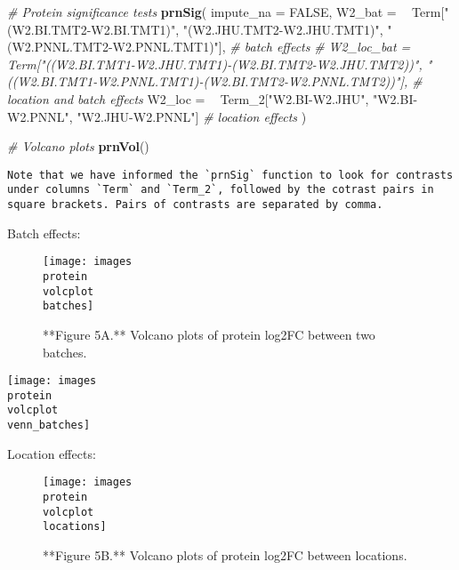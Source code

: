 \documentclass[]{article}
\newenvironment{Shaded}{\begin{snugshade}}{\end{snugshade}}
\newcommand{\CommentTok}[1]{\textcolor[rgb]{0.56,0.35,0.01}{\textit{#1}}}
\newcommand{\DataTypeTok}[1]{\textcolor[rgb]{0.13,0.29,0.53}{#1}}
\newcommand{\DecValTok}[1]{\textcolor[rgb]{0.00,0.00,0.81}{#1}}
\newcommand{\KeywordTok}[1]{\textcolor[rgb]{0.13,0.29,0.53}{\textbf{#1}}}
\newcommand{\NormalTok}[1]{#1}
\newcommand{\OperatorTok}[1]{\textcolor[rgb]{0.81,0.36,0.00}{\textbf{#1}}}
\newcommand{\OtherTok}[1]{\textcolor[rgb]{0.56,0.35,0.01}{#1}}
\newcommand{\StringTok}[1]{\textcolor[rgb]{0.31,0.60,0.02}{#1}}
\begin{document}
\begin{Shaded}
\begin{Highlighting}[]
\CommentTok{# Protein significance tests}
\KeywordTok{prnSig}\NormalTok{(}
    \DataTypeTok{impute_na =} \OtherTok{FALSE}\NormalTok{, }
    \DataTypeTok{W2_bat =} \OperatorTok{~}\StringTok{ }\NormalTok{Term[}\StringTok{"(W2.BI.TMT2-W2.BI.TMT1)"}\NormalTok{, }\StringTok{"(W2.JHU.TMT2-W2.JHU.TMT1)"}\NormalTok{, }\StringTok{"(W2.PNNL.TMT2-W2.PNNL.TMT1)"}\NormalTok{], }\CommentTok{# batch effects}
    \CommentTok{# W2_loc_bat = ~ Term["((W2.BI.TMT1-W2.JHU.TMT1)-(W2.BI.TMT2-W2.JHU.TMT2))", "((W2.BI.TMT1-W2.PNNL.TMT1)-(W2.BI.TMT2-W2.PNNL.TMT2))"], # location and batch effects}
    \DataTypeTok{W2_loc =} \OperatorTok{~}\StringTok{ }\NormalTok{Term_}\DecValTok{2}\NormalTok{[}\StringTok{"W2.BI-W2.JHU"}\NormalTok{, }\StringTok{"W2.BI-W2.PNNL"}\NormalTok{, }\StringTok{"W2.JHU-W2.PNNL"}\NormalTok{] }\CommentTok{# location effects}
\NormalTok{)}

\CommentTok{# Volcano plots}
\KeywordTok{prnVol}\NormalTok{()}
\end{Highlighting}
\end{Shaded}

\begin{verbatim}
Note that we have informed the `prnSig` function to look for contrasts under columns `Term` and `Term_2`, followed by the cotrast pairs in square brackets. Pairs of contrasts are separated by comma.  
\end{verbatim}

Batch effects:

\begin{figure}

\texttt{[image: images\\protein\\volcplot\\batches]} \hfill{}

\caption{**Figure 5A.** Volcano plots of protein log2FC between two batches.}\label{fig:Protein_volcano_batches plots}
\end{figure}

\texttt{[image: images\\protein\\volcplot\\venn\_batches]}

Location effects:

\begin{figure}

\texttt{[image: images\\protein\\volcplot\\locations]} \hfill{}

\caption{**Figure 5B.** Volcano plots of protein log2FC between locations.}\label{fig:Protein_volcano_locations plots}
\end{figure}
\end{document}
